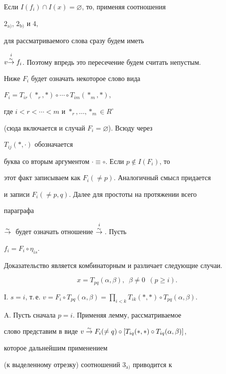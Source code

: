  


\begin{pf} 


Если $I(f_i)\cap I(x)=\varnothing$, то, применяя соотношения 


$2_{\mathrm a)}$, $2_{\mathrm b)}$ и 4, 


для рассматриваемого слова сразу будем иметь 


$v\overset{i\;}{{\overset{\sim}{\to}{}}}{} f_i$. Поэтому впредь это пересечение будем считать непустым. 


Ниже $F_i$ будет означать некоторое слово вида 


$F_i=T_{ir}(*_r,*)\circ\dotsb\circ T_{im}(*_m,*)$, 


где $i<r<\dotsb<m$ и $*_r,\dotsc,*_m\in R^\circ$ 


(сюда включается и случай $F_i=\varnothing$). Всюду через 


$T_{ij}(*,\cdot)$ обозначается 


буква со вторым аргументом $\cdot\equiv\circ$. Если $p\notin I(F_i)$, то 


этот факт записываем как $F_i(\ne p)$. Аналогичный смысл придается 


и записи $F_i(\ne p,q)$. Далее для простоты на протяжении всего 


параграфа 


$\overset{\sim}{\to}{}$ будет означать отношение $\overset{i\;}{{\overset{\sim}{\to}{}}}{}$. Пусть 


$f_i=F_i\circ\eta_{is}$. 


Доказательство является комбинаторным и различает следующие случаи.


$$ 


x=T_{pq}(\alpha,\beta),\ \; \beta\ne0\ \; (p\ge i). 


$$ 


 


I. $s=i$, т.\,е. $v=F_i\circ T_{pq}(\alpha,\beta)=\prod\limits_{i<k} 


T_{ik}(*,*)\circ T_{pq}(\alpha,\beta)$. 


 


A. Пусть сначала $p=i$. Применяя лемму, рассматриваемое 


слово представим в виде $v\simto F_i(\ne q)\circ[T_{iq}(*,*)\circ 


T_{iq}(\alpha,\beta)]$, 


которое дальнейшим применением 


(к выделенному отрезку) соотношений $3_{\mathrm a)}$ приводится к 



\end{pf}
